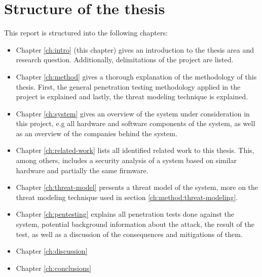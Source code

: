 \section{Structure of the thesis} \label{ch:intro:structure}
This report is structured into the following chapters:
\begin{itemize}
    \item Chapter \ref{ch:intro} (this chapter) gives an introduction to the thesis area and research question. Additionally, delimitations of the project are listed.
    \item Chapter \ref{ch:method} gives a thorough explanation of the methodology of this thesis. First, the general penetration testing methodology applied in the project is explained and lastly, the threat modeling technique is explained.
    \item Chapter \ref{ch:system} gives an overview of the system under consideration in this project, e.g all hardware and software components of the system, as well as an overview of the companies behind the system.
    \item Chapter \ref{ch:related-work} lists all identified related work to this thesis. This, among others, includes a security analysis of a system based on similar hardware and partially the same firmware.
    \item Chapter \ref{ch:threat-model} presents a threat model of the system, more on the threat modeling technique used in section \ref{ch:method:threat-modeling}.
    \item Chapter \ref{ch:pentesting} explains all penetration tests done against the system, potential background information about the attack, the result of the test, as well as a discussion of the consequences and mitigations of them.
    \item Chapter \ref{ch:discussion} \todo
    \item Chapter \ref{ch:conclusions} \todo
\end{itemize}
